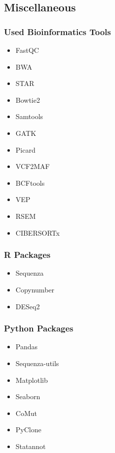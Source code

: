 \documentclass{beamer}
\begin{document}
    \subsection{Miscellaneous}
    \begin{frame}
        \frametitle{Used Bioinformatics Tools}

        \begin{itemize}
            \item FastQC \cite{fastqc1}
            \item BWA \cite{bwa1, bwa2}
            \item STAR \cite{star1}
            \item Bowtie2 \cite{bowtie1}
            \item Samtools \cite{samtools1}
            \item GATK \cite{gatk1, gatk2}
            \item Picard \cite{picard1}
            \item VCF2MAF \cite{vcf2maf1}
            \item BCFtools \cite{bcftools1}
            \item VEP \cite{vep1}
            \item RSEM \cite{RSEM1}
            \item CIBERSORTx \cite{cibersort1}
        \end{itemize}
    \end{frame}

    \begin{frame}
        \frametitle{R Packages}

        \begin{itemize}
            \item Sequenza \cite{sequenza1}
            \item Copynumber \cite{copynumber1, copynumber2}
            \item DESeq2 \cite{DESeq1}
        \end{itemize}
    \end{frame}

    \begin{frame}
        \frametitle{Python Packages}

        \begin{itemize}
            \item Pandas \cite{pandas1, pandas2}
            \item Sequenza-utils \cite{sequenza1}
            \item Matplotlib \cite{matplotlib1}
            \item Seaborn \cite{seaborn1}
            \item CoMut \cite{comut1}
            \item PyClone \cite{pyclone1}
            \item Statannot
        \end{itemize}
    \end{frame}
\end{document}
